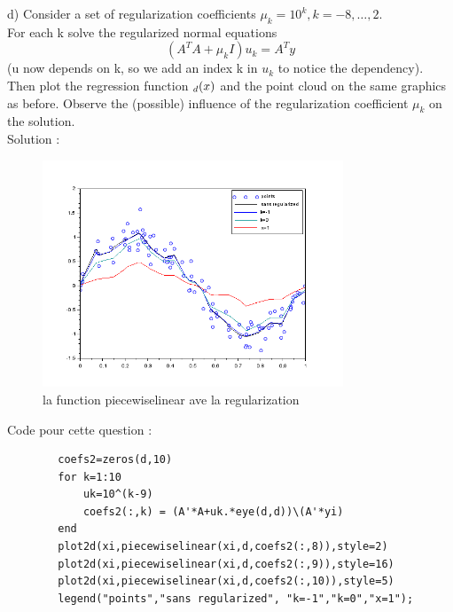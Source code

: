 \documentclass[11pt]{article}
\begin{document}
    d) Consider a set of regularization coefficients $\mu_k = 10^k, k = -8,\ldots,2$.\\
    For each k solve the regularized normal equations
    \begin{equation}
        \left(A^TA+\mu_kI\right)u_k=A^Ty
    \end{equation}
    (u now depends on k, so we add an index k in $u_k$ to notice the dependency). Then
    plot the regression function $\title{f}_d(x)$ and the point cloud on the same graphics as before.
    Observe the (possible) influence of the regularization coefficient $\mu_k$ on the solution.\\
    Solution : 
    \begin{figure}[H]
        \centering
        \includegraphics[width=0.8\textwidth,height=0.5\textwidth]{regu}
        \caption{la function piecewiselinear ave la regularization}
    \end{figure}

    Code pour cette question :
    \begin{verbatim}
        coefs2=zeros(d,10)
        for k=1:10
            uk=10^(k-9)
            coefs2(:,k) = (A'*A+uk.*eye(d,d))\(A'*yi)
        end
        plot2d(xi,piecewiselinear(xi,d,coefs2(:,8)),style=2)
        plot2d(xi,piecewiselinear(xi,d,coefs2(:,9)),style=16)
        plot2d(xi,piecewiselinear(xi,d,coefs2(:,10)),style=5)
        legend("points","sans regularized", "k=-1","k=0","x=1");
    \end{verbatim}
    ~\\
\end{document}
